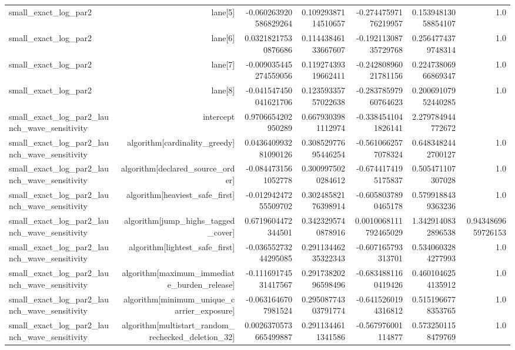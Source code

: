 {\begin{longtable}{lrrrrrr}
small\_exact\_log\_par2 & lane[5] & -0.060263920586829264 & 0.10929387114510657 & -0.27447597176219957 & 0.15394813058854107 & 1.0 \\
small\_exact\_log\_par2 & lane[6] & 0.03218217530876686 & 0.11443846133667607 & -0.19211308735729768 & 0.2564774379748314 & 1.0 \\
small\_exact\_log\_par2 & lane[7] & -0.009035445274559056 & 0.11927439319662411 & -0.24280896021781156 & 0.22473806966869347 & 1.0 \\
small\_exact\_log\_par2 & lane[8] & -0.041547450041621706 & 0.12359335757022638 & -0.28378597960764623 & 0.20069107952440285 & 1.0 \\
small\_exact\_log\_par2\_launch\_wave\_sensitivity & intercept & 0.9706654202950289 & 0.6679303981112974 & -0.3384541041826141 & 2.279784944772672 &  \\
small\_exact\_log\_par2\_launch\_wave\_sensitivity & algorithm[cardinality\_greedy] & 0.043640993281090126 & 0.30852977695446254 & -0.5610662577078324 & 0.6483482442700127 & 1.0 \\
small\_exact\_log\_par2\_launch\_wave\_sensitivity & algorithm[declared\_source\_order] & -0.0844731561052778 & 0.3009975020284612 & -0.6744174195175837 & 0.505471107307028 & 1.0 \\
small\_exact\_log\_par2\_launch\_wave\_sensitivity & algorithm[heaviest\_safe\_first] & -0.01294247255509702 & 0.30248582176398914 & -0.6058037890465178 & 0.5799188439363236 & 1.0 \\
small\_exact\_log\_par2\_launch\_wave\_sensitivity & algorithm[jump\_highs\_tagged\_cover] & 0.6719604472344501 & 0.3423295740878916 & 0.0010068111792465029 & 1.3429140832896538 & 0.9434869659726153 \\
small\_exact\_log\_par2\_launch\_wave\_sensitivity & algorithm[lightest\_safe\_first] & -0.03655273244295085 & 0.29113446235322343 & -0.607165793313701 & 0.5340603284277993 & 1.0 \\
small\_exact\_log\_par2\_launch\_wave\_sensitivity & algorithm[maximum\_immediate\_burden\_release] & -0.11169174531417567 & 0.29173820296598496 & -0.6834881160419426 & 0.4601046254135912 & 1.0 \\
small\_exact\_log\_par2\_launch\_wave\_sensitivity & algorithm[minimum\_unique\_carrier\_exposure] & -0.0631646707981524 & 0.29508774303791774 & -0.6415260194316812 & 0.5151966778353765 & 1.0 \\
small\_exact\_log\_par2\_launch\_wave\_sensitivity & algorithm[multistart\_random\_rechecked\_deletion\_32] & 0.0026370573665499887 & 0.2911344611341586 & -0.567976001114877 & 0.5732501158479769 & 1.0 \\

\end{longtable}}
